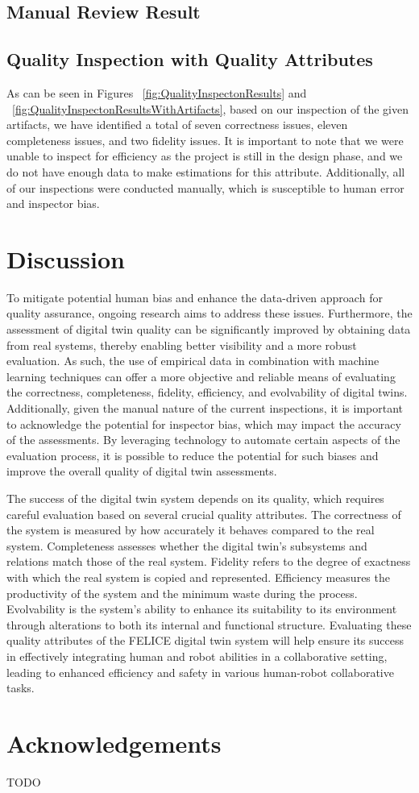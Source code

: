 \documentclass{llncs}
\begin{document}
    \subsection{Manual Review Result}

    \subsection{Quality Inspection with Quality Attributes}


    As can be seen in Figures ~\ref{fig:QualityInspectonResults} and ~\ref{fig:QualityInspectonResultsWithArtifacts}, based on our inspection of the given artifacts,
    we have identified a total of seven correctness issues, eleven completeness issues, and two fidelity issues. 
    It is important to note that we were unable to inspect for efficiency as the project is still in the design phase, 
    and we do not have enough data to make estimations for this attribute. Additionally, all of our inspections were conducted manually, 
    which is susceptible to human error and inspector bias.

    \section{Discussion}

    \label{section:framework_1}
    To mitigate potential human bias and enhance the data-driven approach for quality assurance, ongoing research aims to address these issues. 
    Furthermore, the assessment of digital twin quality can be significantly improved by obtaining data from real systems, thereby enabling better visibility and a more robust evaluation. As such, the use of empirical data in combination with machine learning techniques can offer a more objective and reliable means of evaluating the correctness, completeness, fidelity, efficiency, and evolvability of digital twins. Additionally, given the manual nature of the current inspections, it is important to acknowledge the potential for inspector bias, which may impact the accuracy of the assessments. 
    By leveraging technology to automate certain aspects of the evaluation process, it is possible to reduce the potential for such biases and improve the overall quality of digital twin assessments.

    The success of the digital twin system depends on its quality, which requires careful evaluation based on several crucial quality attributes. The correctness of the system is measured by how accurately it behaves compared to the real system.
    Completeness assesses whether the digital twin's subsystems and relations match those of the real system. 
    Fidelity refers to the degree of exactness with which the real system is copied and represented.
    Efficiency measures the productivity of the system and the minimum waste during the process. 
    Evolvability is the system's ability to enhance its suitability to its environment through alterations to both its internal and functional structure. 
    Evaluating these quality attributes of the FELICE digital twin system will help ensure its success in effectively integrating human and robot abilities in a collaborative setting, leading to enhanced efficiency and safety in various human-robot collaborative tasks.
    \section*{Acknowledgements}
    TODO

    
    
\end{document}
